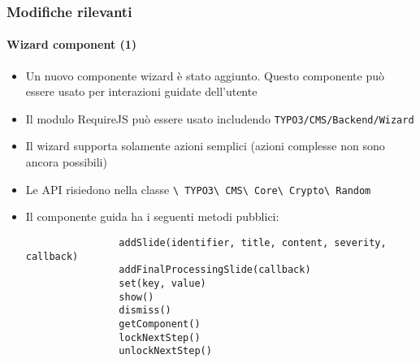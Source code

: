 \begin{frame}[fragile]
	\frametitle{Modifiche rilevanti}
	\framesubtitle{Wizard component (1)}

	\lstset{basicstyle=\tiny\ttfamily}

	\begin{itemize}

		\item Un nuovo componente wizard è stato aggiunto. Questo componente può essere usato per interazioni guidate dell'utente

		\item Il modulo RequireJS può essere usato includendo \texttt{TYPO3/CMS/Backend/Wizard}

		\item Il wizard supporta solamente azioni semplici \newline
			(azioni complesse non sono ancora possibili)

		\item Le API risiedono nella classe
			\texttt{\textbackslash
				TYPO3\textbackslash
				CMS\textbackslash
				Core\textbackslash
				Crypto\textbackslash
				Random}

		\item Il componente guida ha i seguenti metodi pubblici:

			\begin{lstlisting}
				addSlide(identifier, title, content, severity, callback)
				addFinalProcessingSlide(callback)
				set(key, value)
				show()
				dismiss()
				getComponent()
				lockNextStep()
				unlockNextStep()
			\end{lstlisting}

	\end{itemize}

\end{frame}


